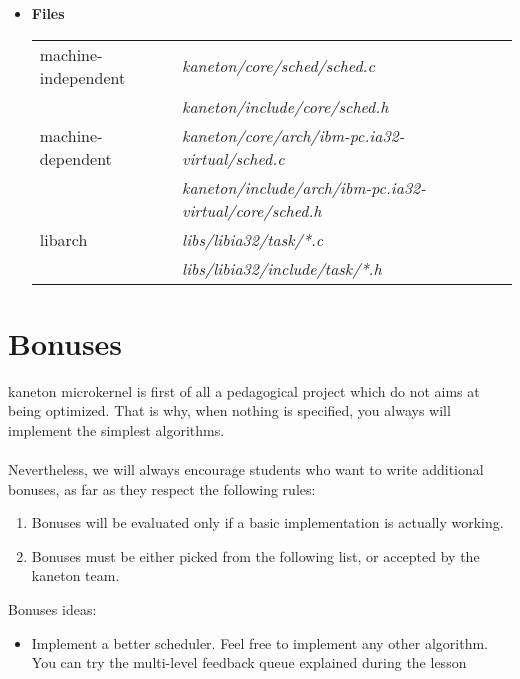 \begin{itemize}
	 {
	   This function initializes the scheduler.
	 }

	 {
	   This function cleans the scheduler.
	 }

  \item {\bf Files}\\

    \begin{tabular}{| l | l |}
      \hline
      machine-independent & {\em kaneton/core/sched/sched.c}\\
      &  {\em kaneton/include/core/sched.h}\\\hline
      machine-dependent & {\em kaneton/core/arch/ibm-pc.ia32-virtual/sched.c}\\
      & {\em kaneton/include/arch/ibm-pc.ia32-virtual/core/sched.h}\\\hline
      libarch & {\em libs/libia32/task/*.c}\\
      &  {\em libs/libia32/include/task/*.h}\\\hline
    \end{tabular}

\end{itemize}

%
%

\newpage

\section{Bonuses}

kaneton microkernel is first of all a pedagogical project which do not
aims at being optimized. That is why, when nothing is specified, you
always will implement the simplest algorithms.\\
\\
Nevertheless, we will always encourage students who want to write
additional bonuses, as far as they respect the following rules:

\begin{enumerate}
  \item Bonuses will be evaluated only if a basic implementation is
  actually working.
  \item Bonuses must be either picked from the following list, or
  accepted by the kaneton team.\\
\end{enumerate}

Bonuses ideas:
\begin{itemize}
\item Implement a better scheduler. Feel free to implement any other
algorithm. You can try the multi-level feedback queue explained during
the lesson
\end{itemize}


